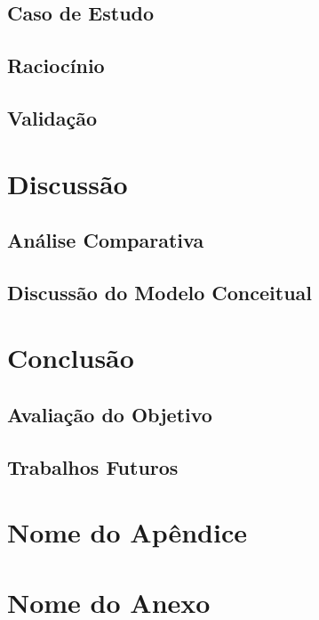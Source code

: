 \documentclass[openright]{normas-utf-tex} %
\begin{document}
	\section{Caso de Estudo} \label{studycase}
			
	\section{Raciocínio} \label{rac}
			
	\section{Validação} \label{validation}
		
\chapter{Discussão}
	
	\section{Análise Comparativa}\label{analisecomparativa}
		
			
		
		
		
				
		
		
	\section{Discussão do Modelo Conceitual}\label{constresult}
		
\label{chap:anacomp}
\chapter{Conclusão}
\label{chpa:conc}
	
	\section{Avaliação do Objetivo}
		
	\section{Trabalhos Futuros}
		

\clearpage %
\label{bibstart}
\label{bibend}

\apendice
\chapter{Nome do Ap\^endice}

\anexo
\chapter{Nome do Anexo}
\end{document}
